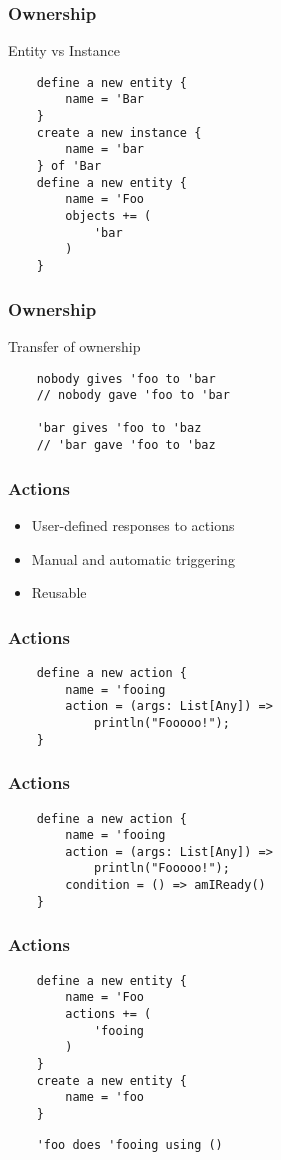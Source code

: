 \documentclass{beamer}
\begin{document}
\begin{frame}[fragile]
    \frametitle{Ownership}
    Entity vs Instance
    \begin{lstlisting}
    define a new entity {
        name = 'Bar
    }
    create a new instance {
        name = 'bar
    } of 'Bar
    define a new entity {
        name = 'Foo
        objects += (
            'bar
        )
    }
    \end{lstlisting}
\end{frame}

\begin{frame}[fragile]
    \frametitle{Ownership}
    Transfer of ownership
    \begin{lstlisting}
    nobody gives 'foo to 'bar
    // nobody gave 'foo to 'bar

    'bar gives 'foo to 'baz
    // 'bar gave 'foo to 'baz
    \end{lstlisting}
\end{frame}

\begin{frame}
    \frametitle{Actions}
    \begin{itemize}[<+->]
        \item{User-defined responses to actions}
        \item{Manual and automatic triggering}
        \item{Reusable}
    \end{itemize}
\end{frame}

\begin{frame}[fragile]
    \frametitle{Actions}
    \begin{lstlisting}
    define a new action {
        name = 'fooing
        action = (args: List[Any]) =>
            println("Fooooo!");
    }
    \end{lstlisting}
\end{frame}

\begin{frame}[fragile]
    \frametitle{Actions}
    \begin{lstlisting}
    define a new action {
        name = 'fooing
        action = (args: List[Any]) =>
            println("Fooooo!");
        condition = () => amIReady()
    }
    \end{lstlisting}
\end{frame}

\begin{frame}[fragile]
    \frametitle{Actions}
    \begin{lstlisting}
    define a new entity {
        name = 'Foo
        actions += (
            'fooing
        )
    }
    create a new entity {
        name = 'foo
    }
    \end{lstlisting}
    \pause
    \begin{lstlisting}
    'foo does 'fooing using ()
    \end{lstlisting}
\end{frame}
\end{document}
